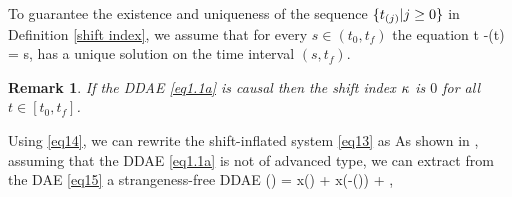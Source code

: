 \documentclass[final,reqno]{siamltex}
\newtheorem{remark}[theorem]{Remark}
\begin{document}
To guarantee the existence and uniqueness of the sequence $\{t_{(j)}| j\geq 0\}$ in Definition \ref{shift index}, we assume that for every $s \in (t_0,t_f)$ the equation
%
\be\label{shift equation}
 t -\tau(t) = s,
\ee
%
has a unique solution on the time interval $(s,t_f)$. 

\begin{remark}
If the DDAE \eqref{eq1.1a} is causal then the shift index $\kappa$ is $0$ for all $t \in [t_0,t_f]$.
\end{remark}

Using \eqref{eq14}, we can rewrite the shift-inflated system \eqref{eq13} as
%
\be\label{eq15}
\ee
%
As shown in \cite{HaM14}, assuming that the DDAE \eqref{eq1.1a} is not of advanced type, we can extract from the DAE \eqref{eq15} a strangeness-free DDAE 
%
\be\label{eq16}
  () \!=\!  x() \!+\!
  x(-\tau()) \!+\! , \ 
\end{document}
